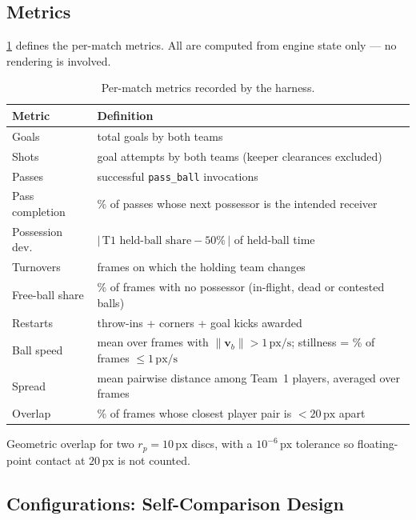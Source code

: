 \documentclass[10pt,twocolumn]{article}
\newcommand{\px}{\ensuremath{\,\mathrm{px}}}
\newcommand{\pxs}{\ensuremath{\,\mathrm{px/s}}}
\newcommand{\code}[1]{\texttt{#1}}
\begin{document}
\subsection{Metrics}\label{sec:metrics}

\cref{tab:metrics} defines the per-match metrics. All are computed from
engine state only --- no rendering is involved.

\begin{table}[t]
\centering\small
\begin{threeparttable}
\caption{Per-match metrics recorded by the harness.}
\label{tab:metrics}
\begin{tabular}{@{}p{2.35cm}p{5.35cm}@{}}
\toprule
Metric & Definition \\
\midrule
Goals & total goals by both teams \\
Shots & goal attempts by both teams (keeper clearances excluded) \\
Passes & successful \code{pass\_ball} invocations \\
Pass completion & \% of passes whose next possessor is the intended receiver \\
Possession dev. & $\bigl|\,\text{T1 held-ball share} - 50\%\,\bigr|$ of held-ball time \\
Turnovers & frames on which the holding team changes \\
Free-ball share & \% of frames with no possessor (in-flight, dead or contested balls) \\
Restarts & throw-ins + corners + goal kicks awarded \\
Ball speed & mean over frames with $\lVert\mathbf v_b\rVert > 1\pxs$; stillness = \% of frames $\le 1\pxs$ \\
Spread & mean pairwise distance among Team~1 players, averaged over frames \\
Overlap & \% of frames whose closest player pair is $< 20\px$ apart\tnote{a} \\
\bottomrule
\end{tabular}
\begin{tablenotes}\footnotesize
\item[a] Geometric overlap for two $r_p=10\px$ discs, with a $10^{-6}\px$
tolerance so floating-point contact at $20\px$ is not counted.
\end{tablenotes}
\end{threeparttable}
\end{table}

\subsection{Configurations: Self-Comparison Design}\label{sec:configs}
\end{document}

